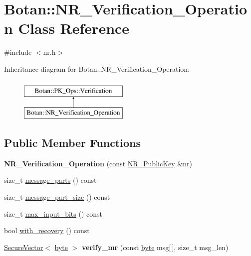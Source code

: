 \hypertarget{classBotan_1_1NR__Verification__Operation}{\section{Botan\-:\-:N\-R\-\_\-\-Verification\-\_\-\-Operation Class Reference}
\label{classBotan_1_1NR__Verification__Operation}
}


{\ttfamily \#include $<$nr.\-h$>$}

Inheritance diagram for Botan\-:\-:N\-R\-\_\-\-Verification\-\_\-\-Operation\-:\begin{figure}[H]
\begin{center}
\leavevmode
\includegraphics[height=2.000000cm]{classBotan_1_1NR__Verification__Operation}
\end{center}
\end{figure}
\subsection*{Public Member Functions}
\begin{DoxyCompactItemize}
\item 
\hypertarget{classBotan_1_1NR__Verification__Operation_ae526c5187be113e588c1838ae6c53a60}{{\bfseries N\-R\-\_\-\-Verification\-\_\-\-Operation} (const \hyperlink{classBotan_1_1NR__PublicKey}{N\-R\-\_\-\-Public\-Key} \&nr)}\label{classBotan_1_1NR__Verification__Operation_ae526c5187be113e588c1838ae6c53a60}

\item 
size\-\_\-t \hyperlink{classBotan_1_1NR__Verification__Operation_a20f22ea52f11173e35621e3b4869ed4e}{message\-\_\-parts} () const 
\item 
size\-\_\-t \hyperlink{classBotan_1_1NR__Verification__Operation_a0670d7646023d5fd637734f8de328c67}{message\-\_\-part\-\_\-size} () const 
\item 
size\-\_\-t \hyperlink{classBotan_1_1NR__Verification__Operation_acd9d4f86c3c4b2cef9a692c31b02f4d9}{max\-\_\-input\-\_\-bits} () const 
\item 
bool \hyperlink{classBotan_1_1NR__Verification__Operation_a1b7876e87e2a6ebfe435ec4f2f8dba96}{with\-\_\-recovery} () const 
\item 
\hypertarget{classBotan_1_1NR__Verification__Operation_ab335e6d474aad56dd8921865aea789b9}{\hyperlink{classBotan_1_1SecureVector}{Secure\-Vector}$<$ \hyperlink{namespaceBotan_a7d793989d801281df48c6b19616b8b84}{byte} $>$ {\bfseries verify\-\_\-mr} (const \hyperlink{namespaceBotan_a7d793989d801281df48c6b19616b8b84}{byte} msg\mbox{[}$\,$\mbox{]}, size\-\_\-t msg\-\_\-len)}\label{classBotan_1_1NR__Verification__Operation_ab335e6d474aad56dd8921865aea789b9}

\end{DoxyCompactItemize}


